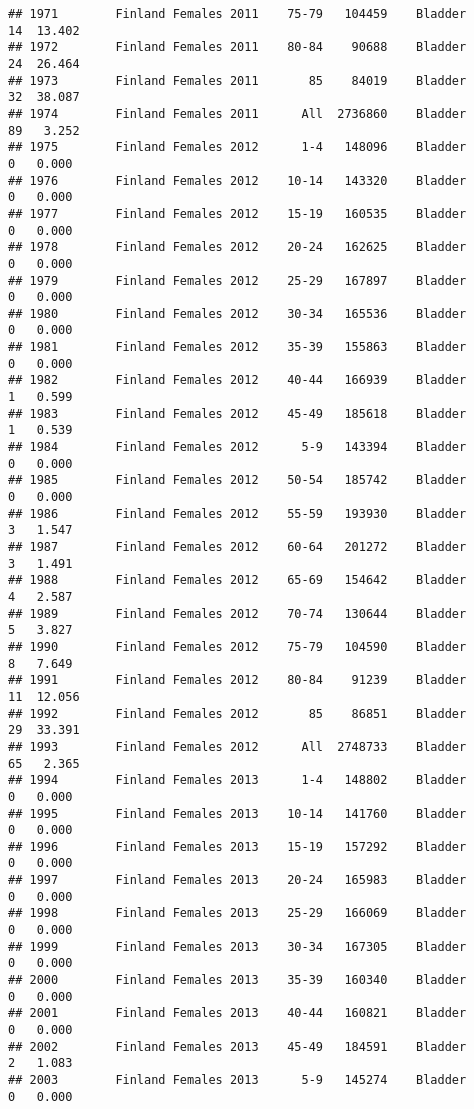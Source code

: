 \documentclass[
]{article}
\begin{document}
\begin{verbatim}
## 1971        Finland Females 2011    75-79   104459    Bladder     14  13.402
## 1972        Finland Females 2011    80-84    90688    Bladder     24  26.464
## 1973        Finland Females 2011       85    84019    Bladder     32  38.087
## 1974        Finland Females 2011      All  2736860    Bladder     89   3.252
## 1975        Finland Females 2012      1-4   148096    Bladder      0   0.000
## 1976        Finland Females 2012    10-14   143320    Bladder      0   0.000
## 1977        Finland Females 2012    15-19   160535    Bladder      0   0.000
## 1978        Finland Females 2012    20-24   162625    Bladder      0   0.000
## 1979        Finland Females 2012    25-29   167897    Bladder      0   0.000
## 1980        Finland Females 2012    30-34   165536    Bladder      0   0.000
## 1981        Finland Females 2012    35-39   155863    Bladder      0   0.000
## 1982        Finland Females 2012    40-44   166939    Bladder      1   0.599
## 1983        Finland Females 2012    45-49   185618    Bladder      1   0.539
## 1984        Finland Females 2012      5-9   143394    Bladder      0   0.000
## 1985        Finland Females 2012    50-54   185742    Bladder      0   0.000
## 1986        Finland Females 2012    55-59   193930    Bladder      3   1.547
## 1987        Finland Females 2012    60-64   201272    Bladder      3   1.491
## 1988        Finland Females 2012    65-69   154642    Bladder      4   2.587
## 1989        Finland Females 2012    70-74   130644    Bladder      5   3.827
## 1990        Finland Females 2012    75-79   104590    Bladder      8   7.649
## 1991        Finland Females 2012    80-84    91239    Bladder     11  12.056
## 1992        Finland Females 2012       85    86851    Bladder     29  33.391
## 1993        Finland Females 2012      All  2748733    Bladder     65   2.365
## 1994        Finland Females 2013      1-4   148802    Bladder      0   0.000
## 1995        Finland Females 2013    10-14   141760    Bladder      0   0.000
## 1996        Finland Females 2013    15-19   157292    Bladder      0   0.000
## 1997        Finland Females 2013    20-24   165983    Bladder      0   0.000
## 1998        Finland Females 2013    25-29   166069    Bladder      0   0.000
## 1999        Finland Females 2013    30-34   167305    Bladder      0   0.000
## 2000        Finland Females 2013    35-39   160340    Bladder      0   0.000
## 2001        Finland Females 2013    40-44   160821    Bladder      0   0.000
## 2002        Finland Females 2013    45-49   184591    Bladder      2   1.083
## 2003        Finland Females 2013      5-9   145274    Bladder      0   0.000

\end{verbatim}
\end{document}
